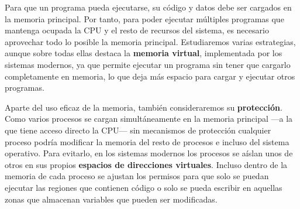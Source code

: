 Para que un programa pueda ejecutarse, su código y datos debe ser
cargados en la memoria principal. Por tanto, para poder ejecutar
múltiples programas que mantenga ocupada la CPU y el resto de recursos
del sistema, es necesario aprovechar todo lo posible la memoria
principal. Estudiaremos varias estrategias, aunque sobre todas ellas
destaca la \textbf{memoria virtual}, implementada por los sistemas
modernos, ya que permite ejecutar un programa sin tener que cargarlo
completamente en memoria, lo que deja más espacio para cargar y ejecutar
otros programas.

Aparte del uso eficaz de la memoria, también consideraremos su
\textbf{protección}. Como varios procesos se cargan simultáneamente en
la memoria principal ---a la que tiene acceso directo la CPU--- sin
mecanismos de protección cualquier proceso podría modificar la memoria
del resto de procesos e incluso del sistema operativo. Para evitarlo, en
los sistemas modernos los procesos se aíslan unos de otros en sus
propios \textbf{espacios de direcciones virtuales}. Incluso dentro de la
memoria de cada proceso se ajustan los permisos para que solo se puedan
ejecutar las regiones que contienen código o solo se pueda escribir en
aquellas zonas que almacenan variables que pueden ser modificadas.
